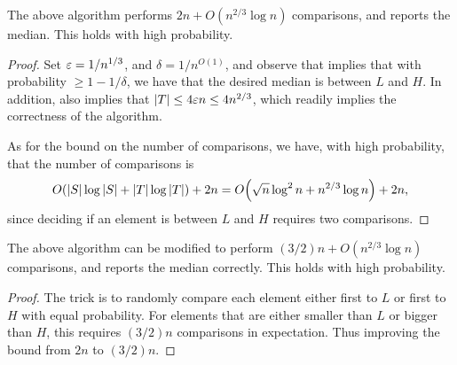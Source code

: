 

\begin{lemma}
    The above algorithm performs $2n +O(n^{2/3} \log n)$ comparisons,
    and reports the median. This holds with high probability.
\end{lemma}
\begin{proof}
    Set ${\varepsilon} = 1/n^{1/3}$, and $\delta = 1/n^{O(1)}$, and observe
    that  implies that with probability
    $\geq 1-1/\delta$, we have that the desired median is between $L$
    and $H$. In addition,  also implies that
    $\left| {T} \right| \leq 4{\varepsilon} n \leq 4n^{2/3}$, which readily implies the
    correctness of the algorithm.


    As for the bound on the number of comparisons, we have, with high
    probability, that the number of comparisons is
    \begin{equation*}
        O\pth{ \cardin{S} \log \cardin{S}
           +
           \cardin{T} \log \cardin{T}}
        +2n
        =%
        O\pth{\sqrt{n} \log^2 n + n^{2/3} \log n } + 2n,
    \end{equation*}
    since deciding if an element is between $L$ and $H$ requires two
    comparisons.        
\end{proof}



\begin{lemma}
    The above algorithm can be modified to perform
    $(3/2)n +O(n^{2/3} \log n)$ comparisons, and reports the median
    correctly. This holds with high probability.
\end{lemma}

\begin{proof}
    The trick is to randomly compare each element either first to $L$
    or first to $H$ with equal probability. For elements that are
    either smaller than $L$ or bigger than $H$, this requires $(3/2)n$
    comparisons in expectation. Thus improving the bound from $2n$ to $(3/2)n$.
\end{proof}

